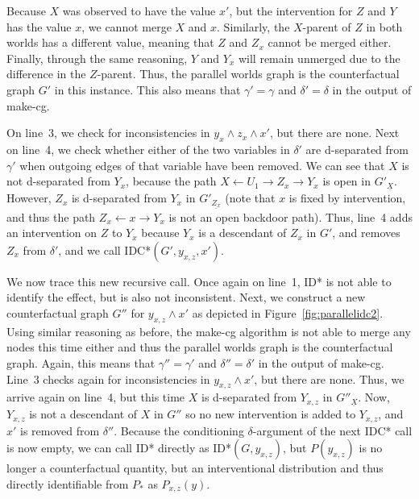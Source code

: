 Because \(X\) was observed to have the value \(x'\), but the intervention for \(Z\) and \(Y\) has the value \(x\), we cannot merge \(X\) and \(x\). Similarly, the \(X\)-parent of \(Z\) in both worlds has a different value, meaning that \(Z\) and \(Z_x\) cannot be merged either. Finally, through the same reasoning, \(Y\) and \(Y_x\) will remain unmerged due to the difference in the \(Z\)-parent. Thus, the parallel worlds graph is the counterfactual graph \(G'\) in this instance. This also means that \(\gamma' = \gamma\) and \(\delta' = \delta\) in the output of make-cg.

On line~3, we check for inconsistencies in \(y_x \wedge z_x \wedge x'\), but there are none. Next on line~4, we check whether either of the two variables in \(\delta'\) are d-separated from \(\gamma'\) when outgoing edges of that variable have been removed. We can see that \(X\) is not d-separated from \(Y_x\), because the path \(X \leftarrow U_1 \rightarrow Z_x \rightarrow Y_x\) is open in \(G'_{\underline X}\). However, \(Z_x\) is d-separated from \(Y_x\) in \(G'_{\underline{Z_x}}\) (note that \(x\) is fixed by intervention, and thus the path \(Z_x \leftarrow x \rightarrow Y_x\) is not an open backdoor path). Thus, line~4 adds an intervention on \(Z\) to \(Y_x\) because \(Y_x\) is a descendant of \(Z_x\) in \(G'\), and removes \(Z_x\) from \(\delta'\), and we call IDC*\((G', y_{x,z}, x')\).

We now trace this new recursive call. Once again on line~1, ID* is not able to identify the effect, but is also not inconsistent. Next, we construct a new counterfactual graph \(G''\) for \(y_{x,z} \wedge x'\) as depicted in Figure~\ref{fig:parallelidc2}. Using similar reasoning as before, the make-cg algorithm is not able to merge any nodes this time either and thus the parallel worlds graph is the counterfactual graph. Again, this means that \(\gamma'' = \gamma'\) and \(\delta'' = \delta'\) in the output of make-cg. Line~3 checks again for inconsistencies in \(y_{x,z} \wedge x'\), but there are none. Thus, we arrive again on line~4, but this time \(X\) is d-separated from \(Y_{x,z}\) in \(G''_{\underline X}\). Now, \(Y_{x,z}\) is not a descendant of \(X\) in \(G''\) so no new intervention is added to \(Y_{x,z}\), and \(x'\) is removed from \(\delta''\). Because the conditioning \(\delta\)-argument of the next IDC* call is now empty, we can call ID* directly as ID*\((G, y_{x,z})\), but \(P(y_{x,z})\) is no longer a counterfactual quantity, but an interventional distribution and thus directly identifiable from \(P_*\) as \(P_{x,z}(y)\).

